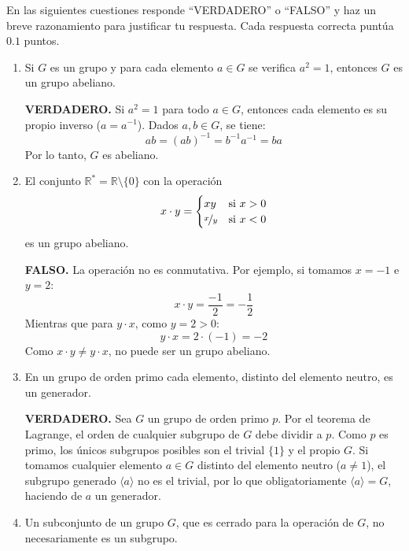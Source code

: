 \documentclass[12pt]{article}
\begin{document}
    \newpage
    \setcounter{ejercicio}{0} %
    \begin{ejercicio}[1 punto]
            En las siguientes cuestiones responde ``VERDADERO'' o ``FALSO'' y haz un breve razonamiento para justificar tu respuesta. Cada respuesta correcta puntúa $0.1$ puntos.
    \begin{enumerate}
            \item Si $G$ es un grupo y para cada elemento $a \in G$ se verifica $a^2 = 1$, entonces $G$ es un grupo abeliano.
            
            \textbf{VERDADERO.} Si $a^2 = 1$ para todo $a \in G$, entonces cada elemento es su propio inverso ($a = a^{-1}$). Dados $a, b \in G$, se tiene:
            \[
            ab = (ab)^{-1} = b^{-1}a^{-1} = ba
            \]
            Por lo tanto, $G$ es abeliano.
            \item El conjunto $\mathbb{R}^* = \mathbb{R} \setminus \{0\}$ con la operación 
            \[
            x \cdot y = \begin{cases} 
            xy & \text{si } x > 0 \\ 
            \nicefrac{x}{y} & \text{si } x < 0 
            \end{cases}
            \]
            es un grupo abeliano.


            \textbf{FALSO.} La operación no es conmutativa. Por ejemplo, si tomamos $x = -1$ e $y = 2$:
            \[
            x \cdot y = \frac{-1}{2} = -\frac{1}{2}
            \]
            Mientras que para $y \cdot x$, como $y = 2 > 0$:
            \[
            y \cdot x = 2 \cdot (-1) = -2
            \]
            Como $x \cdot y \neq y \cdot x$, no puede ser un grupo abeliano.
            \item En un grupo de orden primo cada elemento, distinto del elemento neutro, es un generador.
            
            \textbf{VERDADERO.} Sea $G$ un grupo de orden primo $p$. Por el teorema de Lagrange, el orden de cualquier subgrupo de $G$ debe dividir a $p$. Como $p$ es primo, los únicos subgrupos posibles son el trivial $\{1\}$ y el propio $G$. Si tomamos cualquier elemento $a \in G$ distinto del elemento neutro ($a \neq 1$), el subgrupo generado $\langle a \rangle$ no es el trivial, por lo que obligatoriamente $\langle a \rangle = G$, haciendo de $a$ un generador.
            \item Un subconjunto de un grupo $G$, que es cerrado para la operación de $G$, no necesariamente es un subgrupo.
            

\end{enumerate}
\end{ejercicio}
\end{document}
